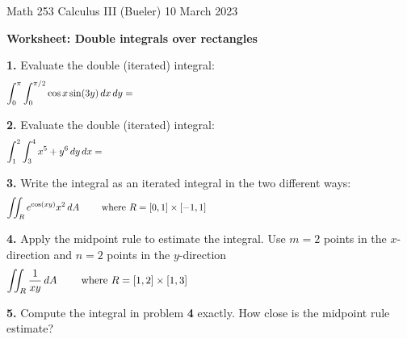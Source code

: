 \documentclass[11pt]{amsart}
\newcommand{\prob}[1]{\bigskip\noindent\textbf{#1.}\quad }
\begin{document}
\scriptsize \noindent Math 253 Calculus III (Bueler) \hfill 10 March 2023 
\normalsize\medskip

\Large\centerline{\textbf{Worksheet: Double integrals over rectangles}}
\medskip
\normalsize

\thispagestyle{empty}

\bigskip

\prob{1}  Evaluate the double (iterated) integral:
$$\int_0^\pi \int_0^{\pi/2} \cos x \sin(3y)\,dx\,dy = \hspace{4.0in}$$
\vfill

\prob{2}  Evaluate the double (iterated) integral:
$$\int_1^2 \int_3^4 x^5 + y^6\,dy\,dx = \hspace{4.5in}$$
\vfill

\prob{3}  Write the integral as an iterated integral in the two different ways:
$$\iint_R e^{\cos(xy)} x^2\,dA \qquad \text{ where } R=[0,1]\times[-1,1] \hspace{3.0in}$$
\vfill

\clearpage\newpage
\prob{4}  Apply the midpoint rule to estimate the integral.  Use $m=2$ points in the $x$-direction and $n=2$ points in the $y$-direction
$$\iint_R \frac{1}{xy}\,dA \qquad \text{ where } R=[1,2]\times[1,3] \hspace{3.0in}$$
\vfill

\prob{5}  Compute the integral in problem \textbf{4} exactly.  How close is the midpoint rule estimate?
\vspace{3.5in}
\end{document}
